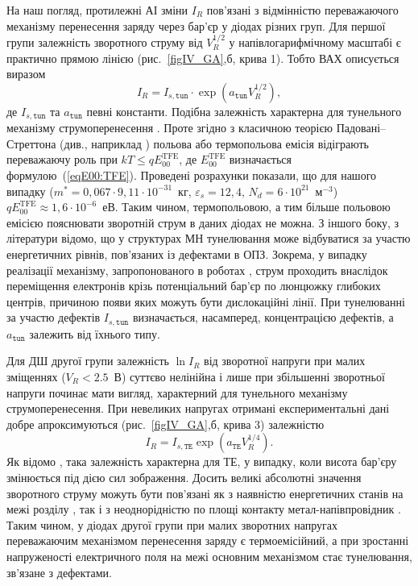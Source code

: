 На наш погляд, протилежні АІ зміни $I_R$ пов’язані з відмінністю переважаючого механізму перенесення заряду через бар'єр у діодах різних груп.
Для першої групи залежність зворотного струму від $V_R^{1/2}$ у напівлогарифмічному масштабі є практично прямою лінією (рис.~\ref{figIV_GA},б, крива 1).
Тобто ВАХ описується виразом
\begin{equation}\label{eqIR1:GA}
I_R=I_{s,\mathtt{tun}}\cdot\exp\left(a_\mathtt{tun}V_R^{1/2}\right),
\end{equation}
де
$I_{s,\mathtt{tun}}$ та $a_\mathtt{tun}$ певні константи.
Подібна залежність характерна для тунельного механізму струмоперенесення \cite{Rhoderick1988}.
Проте згідно з класичною теорією Падовані--Стреттона (див., наприклад \cite{Rhoderick1988,Singh1994}) польова або термопольова емісія відіграють
переважаючу роль при $kT\leq qE_{00}^\mathrm{TFE}$,
де $E_{00}^\mathrm{TFE}$ визначається формулою~(\ref{eqE00:TFE}).
Проведені розрахунки показали, що для нашого випадку ($m^*=0,067\cdot9,11\cdot10^{-31}$~кг,
$\varepsilon_s=12,4$, $N_d=6\cdot10^{21}$~м$^{-3}$) $qE_{00}^\mathrm{TFE}\approx1,6\cdot10^{-6}$~еВ.
Таким чином, термопольовою, а тим більше польовою емісією пояснювати зворотній струм в даних діодах не можна.
З іншого боку, з літератури \cite{Evstropov,Evstropov2000,Ganichev:2000,PipinsFTP,Pipinys1999} відомо, що у структурах МН тунелювання може відбуватися за участю енергетичних рівнів, пов'язаних із дефектами в ОПЗ.
Зокрема, у випадку реалізації механізму, запропонованого в роботах \cite{Evstropov,Evstropov2000}, струм проходить внаслідок переміщення електронів
крізь потенціальний бар'єр по люнцюжку глибоких центрів, причиною появи яких можуть бути дислокаційні лінії.
При тунелюванні за участю дефектів $I_{s,\mathtt{tun}}$ визначається, насамперед, концентрацією дефектів,
а $a_\mathtt{tun}$ залежить від їхнього типу.

Для ДШ другої групи залежність $\ln I_R$ від зворотної напруги при малих зміщеннях ($V_R<2.5$~В) суттєво нелінійна
і лише при збільшенні зворотньої напруги починає мати вигляд, характерний для тунельного механізму струмоперенесення.
При невеликих напругах отримані експериментальні дані добре апроксимуються (рис.~\ref{figIV_GA},б, крива 3) залежністю
\begin{equation}\label{eqIR2:GA}
I_R=I_{s,\mathtt{TE}}\exp\left(a_\mathtt{TE}V_R^{1/4}\right).
\end{equation}
Як відомо \cite{Rhoderick1988},
така залежність характерна для ТЕ, у випадку, коли висота бар’єру змінюється під дією сил зображення.
Досить великі абсолютні значення зворотного струму можуть бути пов’язані як з наявністю енергетичних станів на межі розділу \cite{Singh1994,Tseng1987}, так і з неоднорідністю по площі контакту метал-напівпровідник \cite{Askerov:PhD}.
Таким чином, у діодах другої групи при малих зворотних напругах переважаючим механізмом перенесення заряду є термоемісійний, а при зростанні напруженості електричного поля на межі основним механізмом стає тунелювання, зв'язане з дефектами.

